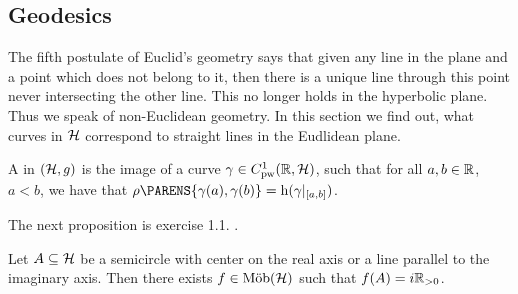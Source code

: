 \subsection{Geodesics}
The fifth postulate of Euclid's geometry says that given any line in the plane and a point which does not belong to it, then there is a unique line through this point never intersecting the other line. This no longer holds in the hyperbolic plane. Thus we speak of non-Euclidean geometry. In this section we find out, what curves in $\mathcal{H}$ correspond to straight lines in the Eudlidean plane.

\begin{definition}[Geodesics]
	A  in $(\mathcal{H},g)$ is the image of a curve $\gamma \in C^1_{\mathrm{pw}}(\mathbb{R},\mathcal{H})$, such that for all $a,b \in \mathbb{R}$, $a < b$, we have that $\rho\PARENS{\gamma(a),\gamma(b)} = \h(\gamma\vert_{\intcc{a,b}})$.
\end{definition}

The next proposition is exercise 1.1. \cite[21]{katok:Fuchsian_groups:1992}.

\begin{proposition}
	Let $A \subseteq \mathcal{H}$ be a semicircle with center on the real axis or a line parallel to the imaginary axis. Then there exists $f \in \mathrm{M\ddot{o}b}(\mathcal{H})$ such that $f(A) = i\mathbb{R}_{>0}$.
	\label{prop:mapping_to_imaginary_axis}
\end{proposition}

